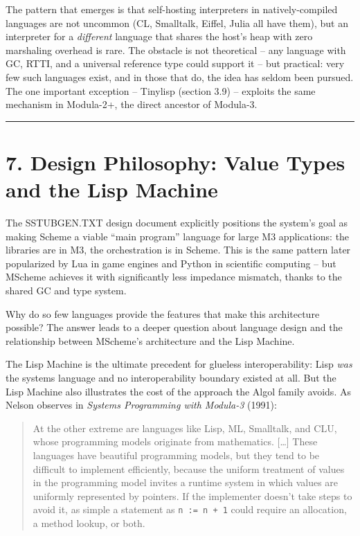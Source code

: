\documentclass[
  12pt,
]{report}
\newcommand{\passthrough}[1]{#1}
\begin{document}
The pattern that emerges is that self-hosting interpreters in
natively-compiled languages are not uncommon (CL, Smalltalk, Eiffel,
Julia all have them), but an interpreter for a \emph{different} language
that shares the host's heap with zero marshaling overhead is rare. The
obstacle is not theoretical -- any language with GC, RTTI, and a
universal reference type could support it -- but practical: very few
such languages exist, and in those that do, the idea has seldom been
pursued. The one important exception -- Tinylisp (section 3.9) --
exploits the same mechanism in Modula-2+, the direct ancestor of
Modula-3.

\begin{center}\rule{0.5\linewidth}{0.5pt}\end{center}

\section{7. Design Philosophy: Value Types and the Lisp
Machine}\label{design-philosophy-value-types-and-the-lisp-machine}

The SSTUBGEN.TXT design document explicitly positions the system's goal
as making Scheme a viable ``main program'' language for large M3
applications: the libraries are in M3, the orchestration is in Scheme.
This is the same pattern later popularized by Lua in game engines and
Python in scientific computing -- but MScheme achieves it with
significantly less impedance mismatch, thanks to the shared GC and type
system.

Why do so few languages provide the features that make this architecture
possible? The answer leads to a deeper question about language design
and the relationship between MScheme's architecture and the Lisp
Machine.

The Lisp Machine is the ultimate precedent for glueless
interoperability: Lisp \emph{was} the systems language and no
interoperability boundary existed at all. But the Lisp Machine also
illustrates the cost of the approach the Algol family avoids. As Nelson
observes in \emph{Systems Programming with Modula-3} (1991):

\begin{quote}
At the other extreme are languages like Lisp, ML, Smalltalk, and CLU,
whose programming models originate from mathematics. {[}\ldots{]} These
languages have beautiful programming models, but they tend to be
difficult to implement efficiently, because the uniform treatment of
values in the programming model invites a runtime system in which values
are uniformly represented by pointers. If the implementer doesn't take
steps to avoid it, as simple a statement as
\passthrough{\lstinline!n := n + 1!} could require an allocation, a
method lookup, or both.
\end{quote}
\end{document}
